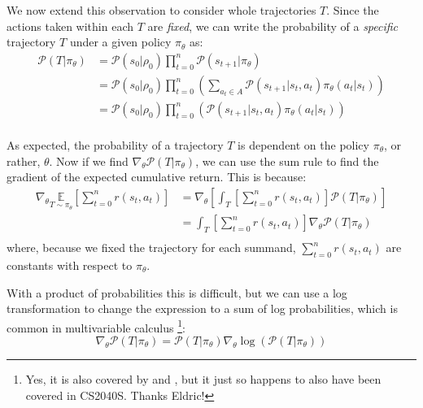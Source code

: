 \documentclass{article} %
\begin{document}
We now extend this observation to consider whole trajectories $T$. Since the actions taken within each $T$ are \textit{fixed},
we can write the probability of a \textit{specific} trajectory $T$ under a given policy $\pi_\theta$ as:
\begin{equation} \label{prob_traj}
    \begin{aligned}
        \mathcal{P}(T | \pi_\theta) & = \mathcal{P}(s_0 | \rho_0) \prod_{t=0}^{n} \mathcal{P}(s_{t + 1} | \pi_\theta) \\
                                    & = \mathcal{P}(s_0 | \rho_0) \prod_{t=0}^{n} \left( \sum_{a_t \in A} \mathcal{P}(s_{t + 1} | s_t, a_t) \pi_\theta(a_t | s_t) \right) \\
                                    & = \mathcal{P}(s_0 | \rho_0) \prod_{t=0}^{n} \left(\mathcal{P}(s_{t + 1} | s_t, a_t) \pi_\theta(a_t | s_t) \right) \\
    \end{aligned}
\end{equation}

As expected, the probability of a trajectory $T$ is dependent on the policy $\pi_\theta$, or rather, $\theta$.
Now if we find $\nabla_{\theta} \mathcal{P}(T | \pi_\theta)$, we can use the sum rule to find the gradient of the expected cumulative return.
This is because:
\begin{equation} \label{gradient_obj}
    \begin{aligned}
    \nabla_\theta \underset{T \sim \pi_\theta}{\mathbb{E}} \left[ \sum_{t=0}^{n} r(s_t, a_t) \right] 
        &= \nabla_\theta \left[ \int_{T} \left[\sum_{t=0}^{n} r(s_t, a_t) \right] \mathcal{P}(T | \pi_\theta) \right] \\
        &= \int_{T} \left[\sum_{t=0}^{n} r(s_t, a_t) \right] \nabla_\theta \mathcal{P}(T | \pi_\theta) \\
    \end{aligned}
\end{equation}
where, because we fixed the trajectory for each summand, $\sum_{t=0}^{n} r(s_t, a_t)$ are constants with respect to $\pi_\theta$.

With a product of probabilities this is difficult, but we can use a log transformation to change the expression to a sum of log probabilities, 
which is common in multivariable calculus 
\footnote{Yes, it is also covered by \cite{SpinningUp-2018} and \cite{Williams-1992}, but it just so happens to also have been covered in CS2040S. Thanks Eldric!}:
\begin{equation} \label{log_trick}
    \nabla_\theta \mathcal{P}(T | \pi_\theta) = \mathcal{P}(T | \pi_\theta) \nabla_\theta \log(\mathcal{P}(T | \pi_\theta))
\end{equation}
\end{document}

